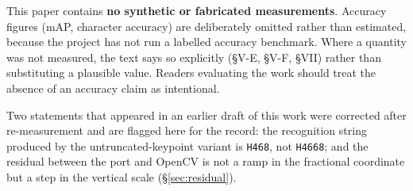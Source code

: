 \documentclass[journal]{IEEEtran}
\begin{document}
This paper contains \textbf{no synthetic or fabricated measurements}. Accuracy
figures (mAP, character accuracy) are deliberately omitted rather than estimated,
because the project has not run a labelled accuracy benchmark. Where a quantity
was not measured, the text says so explicitly (\S V-E, \S V-F, \S VII) rather
than substituting a plausible value. Readers evaluating the work should treat the
absence of an accuracy claim as intentional.

Two statements that appeared in an earlier draft of this work were corrected
after re-measurement and are flagged here for the record: the recognition string
produced by the untruncated-keypoint variant is \texttt{H468}, not
\texttt{H4668}; and the residual between the port and OpenCV is not a ramp in the
fractional coordinate but a step in the vertical scale (\S\ref{sec:residual}).
\end{document}
